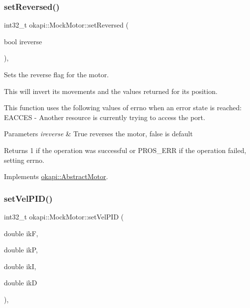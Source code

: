 \mbox{\label{classokapi_1_1MockMotor_a775801b4a121c615a6442a80814e82b3}} 
\subsubsection{\texorpdfstring{setReversed()}{setReversed()}}
{\footnotesize\ttfamily int32\+\_\+t okapi\+::\+Mock\+Motor\+::set\+Reversed (\begin{DoxyParamCaption}\item[{bool}]{ireverse }\end{DoxyParamCaption})\hspace{0.3cm}{\ttfamily [override]}, {\ttfamily [virtual]}}



Sets the reverse flag for the motor. 

This will invert its movements and the values returned for its position.

This function uses the following values of errno when an error state is reached\+: E\+A\+C\+C\+ES -\/ Another resource is currently trying to access the port.


\begin{DoxyParams}{Parameters}
{\em ireverse} & True reverses the motor, false is default \\
\hline
\end{DoxyParams}
\begin{DoxyReturn}{Returns}
1 if the operation was successful or P\+R\+O\+S\+\_\+\+E\+RR if the operation failed, setting errno. 
\end{DoxyReturn}


Implements \mbox{\hyperlink{classokapi_1_1AbstractMotor_a72a6a4eb9d237ad57b92401b08ad64fa}{okapi\+::\+Abstract\+Motor}}.

\mbox{\label{classokapi_1_1MockMotor_a5b22622e342d38625dd0da8b488828e9}} 
\subsubsection{\texorpdfstring{setVelPID()}{setVelPID()}}
{\footnotesize\ttfamily int32\+\_\+t okapi\+::\+Mock\+Motor\+::set\+Vel\+P\+ID (\begin{DoxyParamCaption}\item[{double}]{ikF,  }\item[{double}]{ikP,  }\item[{double}]{ikI,  }\item[{double}]{ikD }\end{DoxyParamCaption})\hspace{0.3cm}{\ttfamily [override]}, {\ttfamily [virtual]}}



